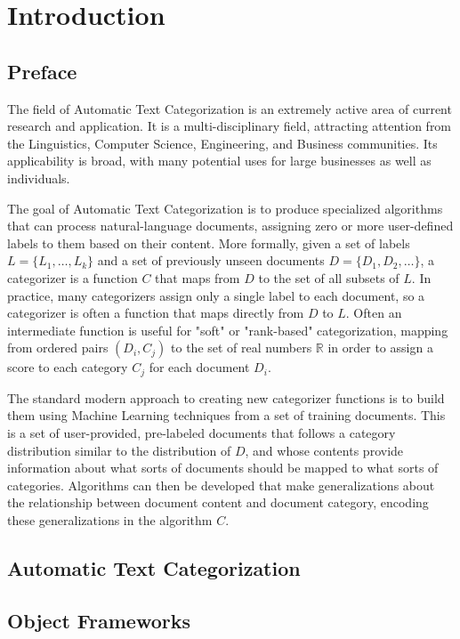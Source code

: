 \chapter{Introduction}

\section{Preface}

The field of Automatic Text Categorization is an extremely active area
of current research and application.  It is a multi-disciplinary
field, attracting attention from the Linguistics, Computer Science,
Engineering, and Business communities.  Its applicability is broad,
with many potential uses for large businesses as well as individuals.

The goal of Automatic Text Categorization is to produce specialized
algorithms that can process natural-language documents, assigning zero
or more user-defined labels to them based on their content.  More
formally, given a set of labels $L = \{L_1, \ldots, L_k\}$ and a set of
previously unseen documents $D = \{D_1, D_2, \ldots \}$, a categorizer is a
function $C$ that maps from $D$ to the set of all subsets of $L$.  In
practice, many categorizers assign only a single label to each
document, so a categorizer is often a function that maps directly from
$D$ to $L$.  Often an intermediate function is useful for "soft" or 
"rank-based" categorization, mapping from ordered pairs $(D_i, C_j)$ 
to the set of real numbers $\mathbb{R}$ in order to assign a score 
to each category $C_j$ for each document $D_i$.

The standard modern approach to creating new categorizer functions is
to build them using Machine Learning techniques from a set of training
documents.  This is a set of user-provided, pre-labeled documents that
follows a category
distribution similar to the distribution of $D$, and whose contents
provide information about what sorts of documents should be mapped to
what sorts of categories.  Algorithms can then be developed that make
generalizations about the relationship between document content and
document category, encoding these generalizations in the algorithm $C$.

\section{Automatic Text Categorization}

\section{Object Frameworks}

